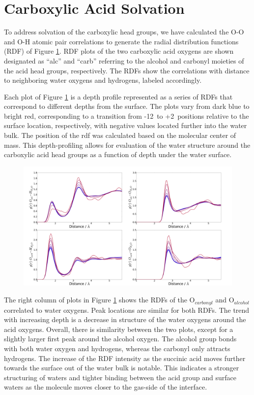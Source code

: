 \section {Carboxylic Acid Solvation}

To address solvation of the carboxylic head groups, we have calculated the O-O and O-H atomic pair correlations to generate the radial distribution functions (RDF) of Figure \ref{fig:rdfs}. RDF plots of the two carboxylic acid oxygens are shown designated as ``alc'' and ``carb'' referring to the alcohol and carbonyl moieties of the acid head groups, respectively. The RDFs show the correlations with distance to neighboring water oxygens and hydrogens, labeled accordingly.

Each plot of Figure \ref{fig:rdfs} is a depth profile represented as a series of RDFs that correspond to different depths from the surface. The plots vary from dark blue to bright red, corresponding to a transition from -12\angs~to +2\angs~positions relative to the surface location, respectively, with negative values located further into the water bulk. The position of the rdf was calculated based on the molecular center of mass. This depth-profiling allows for evaluation of the water structure around the carboxylic acid head groups as a function of depth under the water surface.

\begin{figure}[h!]
	\begin{center}
		\includegraphics[scale=1.0]{images/rdf/rdf-collection.png}
		\caption{}
		\label{fig:rdfs}
	\end{center}
\end{figure}

The right column of plots in Figure \ref{fig:rdfs} shows the RDFs of the O$_{carbonyl}$ and O$_{alcohol}$ correlated to water oxygens. Peak locations are similar for both RDFs. The trend with increasing depth is a decrease in structure of the water oxygens around the acid oxygens. Overall, there is similarity between the two plots, except for a slightly larger first peak around the alcohol oxygen. The alcohol group bonds with both water oxygen and hydrogens, whereas the carbonyl only attracts hydrogens. The increase of the RDF intensity as the succinic acid moves further towards the surface out of the water bulk is notable. This indicates a stronger structuring of waters and tighter binding between the acid group and surface waters as the molecule moves closer to the gas-side of the interface.

